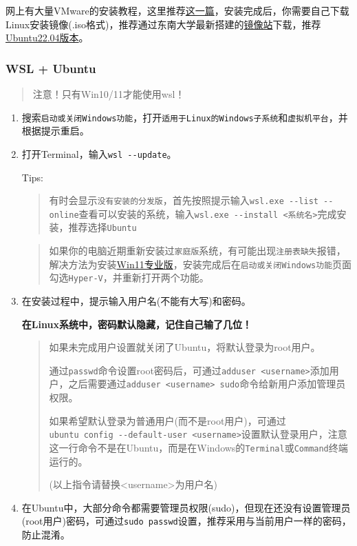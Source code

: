\documentclass[
]{article}
\begin{document}
网上有大量VMware的安装教程，这里推荐\href{https://zhuanlan.zhihu.com/p/617093823}{这一篇}，安装完成后，你需要自己下载Linux安装镜像(.iso格式)，推荐通过东南大学最新搭建的\href{https://mirrors.seu.edu.cn/}{镜像站}下载，推荐\href{https://mirrors.seu.edu.cn/ubuntu-releases/22.04/ubuntu-22.04.4-desktop-amd64.iso}{Ubuntu22.04版本}。

\subsubsection{WSL + Ubuntu}\label{wsl--ubuntu}

\begin{quote}
	注意！只有Win10/11才能使用wsl！
\end{quote}

\begin{enumerate}
	\def\labelenumi{\arabic{enumi}.}
	\item
	      搜索\texttt{启动或关闭Windows功能}，打开\texttt{适用于Linux的Windows子系统}和\texttt{虚拟机平台}，并根据提示重启。
	\item
	      打开Terminal，输入\texttt{wsl\ -\/-update}。

	      Tips:
	      \begin{quote}
		      有时会显示\texttt{没有安装的分发版}，首先按照提示输入\texttt{wsl.exe\ -\/-list\ -\/-online}查看可以安装的系统，输入\texttt{wsl.exe\ -\/-install\ \textless{}系统名\textgreater{}}完成安装，推荐选择\texttt{Ubuntu}
	      \end{quote}

	      \begin{quote}
		      如果你的电脑近期重新安装过\texttt{家庭版}系统，有可能出现\texttt{注册表缺失}报错，解决方法为安装\href{https://software.seu.edu.cn/soft/detail/18}{Win11专业版}，安装完成后在\texttt{启动或关闭Windows功能}页面勾选\texttt{Hyper-V}，并重新打开两个功能。
	      \end{quote}
	\item
	      在安装过程中，提示输入用户名(不能有大写)和密码。

	      \textbf{在Linux系统中，密码默认隐藏，记住自己输了几位！}

	      \begin{quote}
		      如果未完成用户设置就关闭了Ubuntu，将默认登录为root用户。

		      通过\texttt{passwd}命令设置root密码后，可通过\texttt{adduser\ \textless{}username\textgreater{}}添加用户，之后需要通过\texttt{adduser\ \textless{}username\textgreater{}\ sudo}命令给新用户添加管理员权限。

		      如果希望默认登录为普通用户(而不是root用户)，可通过\texttt{ubuntu\ config\ -\/-default-user\ \textless{}username\textgreater{}}设置默认登录用户，注意这一行命令不是在Ubuntu，而是在Windows的\texttt{Terminal}或\texttt{Command}终端运行的。

		      (以上指令请替换\textless{}username\textgreater 为用户名)
	      \end{quote}
	\item
	      在Ubuntu中，大部分命令都需要管理员权限(sudo)，但现在还没有设置管理员(root用户)密码，可通过\texttt{sudo\ passwd}设置，推荐采用与当前用户一样的密码，防止混淆。
\end{enumerate}
\end{document}
